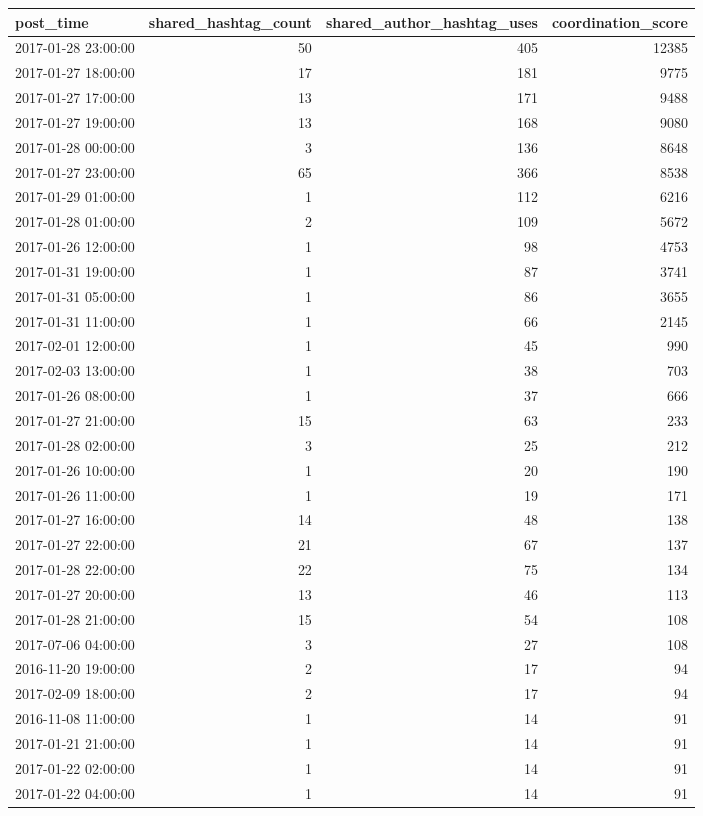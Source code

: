 \begin{tabular}{lrrr}
\toprule
post\_time & shared\_hashtag\_count & shared\_author\_hashtag\_uses & coordination\_score \\
\midrule
2017-01-28 23:00:00 & 50 & 405 & 12385 \\
2017-01-27 18:00:00 & 17 & 181 & 9775 \\
2017-01-27 17:00:00 & 13 & 171 & 9488 \\
2017-01-27 19:00:00 & 13 & 168 & 9080 \\
2017-01-28 00:00:00 & 3 & 136 & 8648 \\
2017-01-27 23:00:00 & 65 & 366 & 8538 \\
2017-01-29 01:00:00 & 1 & 112 & 6216 \\
2017-01-28 01:00:00 & 2 & 109 & 5672 \\
2017-01-26 12:00:00 & 1 & 98 & 4753 \\
2017-01-31 19:00:00 & 1 & 87 & 3741 \\
2017-01-31 05:00:00 & 1 & 86 & 3655 \\
2017-01-31 11:00:00 & 1 & 66 & 2145 \\
2017-02-01 12:00:00 & 1 & 45 & 990 \\
2017-02-03 13:00:00 & 1 & 38 & 703 \\
2017-01-26 08:00:00 & 1 & 37 & 666 \\
2017-01-27 21:00:00 & 15 & 63 & 233 \\
2017-01-28 02:00:00 & 3 & 25 & 212 \\
2017-01-26 10:00:00 & 1 & 20 & 190 \\
2017-01-26 11:00:00 & 1 & 19 & 171 \\
2017-01-27 16:00:00 & 14 & 48 & 138 \\
2017-01-27 22:00:00 & 21 & 67 & 137 \\
2017-01-28 22:00:00 & 22 & 75 & 134 \\
2017-01-27 20:00:00 & 13 & 46 & 113 \\
2017-01-28 21:00:00 & 15 & 54 & 108 \\
2017-07-06 04:00:00 & 3 & 27 & 108 \\
2016-11-20 19:00:00 & 2 & 17 & 94 \\
2017-02-09 18:00:00 & 2 & 17 & 94 \\
2016-11-08 11:00:00 & 1 & 14 & 91 \\
2017-01-21 21:00:00 & 1 & 14 & 91 \\
2017-01-22 02:00:00 & 1 & 14 & 91 \\
2017-01-22 04:00:00 & 1 & 14 & 91 \\

\end{tabular}
